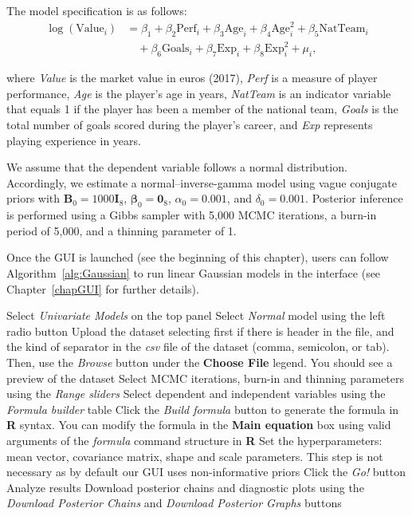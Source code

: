 The model specification is as follows:
\begin{align*}
	\log(\text{Value}_i) &= {\beta}_1 + {\beta}_2 \text{Perf}_i + {\beta}_3 \text{Age}_i + {\beta}_4 \text{Age}_i^2 + {\beta}_5 \text{NatTeam}_i \\
	&\quad + {\beta}_6 \text{Goals}_i + {\beta}_7 \text{Exp}_i + {\beta}_8 \text{Exp}_i^2 + \mu_i,
\end{align*}

where \textit{Value} is the market value in euros (2017), \textit{Perf} is a measure of player performance, \textit{Age} is the player's age in years, \textit{NatTeam} is an indicator variable that equals 1 if the player has been a member of the national team, \textit{Goals} is the total number of goals scored during the player's career, and \textit{Exp} represents playing experience in years.  

We assume that the dependent variable follows a normal distribution. Accordingly, we estimate a normal–inverse-gamma model using vague conjugate priors with ${\bm{B}}_0 = 1000{\bm{I}}_{8}$, $\bm{\beta}_0 = {\bm{0}}_{8}$, $\alpha_0 = 0.001$, and $\delta_0 = 0.001$. Posterior inference is performed using a Gibbs sampler with 5,000 MCMC iterations, a burn-in period of 5,000, and a thinning parameter of 1.

Once the GUI is launched (see the beginning of this chapter), users can follow Algorithm~\ref{alg:Gaussian} to run linear Gaussian models in the interface (see Chapter~\ref{chapGUI} for further details).

\begin{algorithm}[h!]
	\caption{Gaussian linear model}\label{alg:Gaussian}
	\begin{algorithmic}[1]  		 			
		\State Select \textit{Univariate Models} on the top panel
		\State Select \textit{Normal} model using the left radio button
		\State Upload the dataset selecting first if there is header in the file, and the kind of separator in the \textit{csv} file of the dataset (comma, semicolon, or tab). Then, use the \textit{Browse} button under the \textbf{Choose File} legend. You should see a preview of the dataset
		\State Select MCMC iterations, burn-in and thinning parameters using the \textit{Range sliders}
		\State Select dependent and independent variables using the \textit{Formula builder} table
		\State Click the \textit{Build formula} button to generate the formula in \textbf{R} syntax. You can modify the formula in the \textbf{Main equation} box using valid arguments of the \textit{formula} command structure in \textbf{R}
		\State Set the hyperparameters: mean vector, covariance matrix, shape and scale parameters. This step is not necessary as by default our GUI uses non-informative priors
		\State Click the \textit{Go!} button
		\State Analyze results
		\State Download posterior chains and diagnostic plots using the \textit{Download Posterior Chains} and \textit{Download Posterior Graphs} buttons
	\end{algorithmic} 
\end{algorithm}

